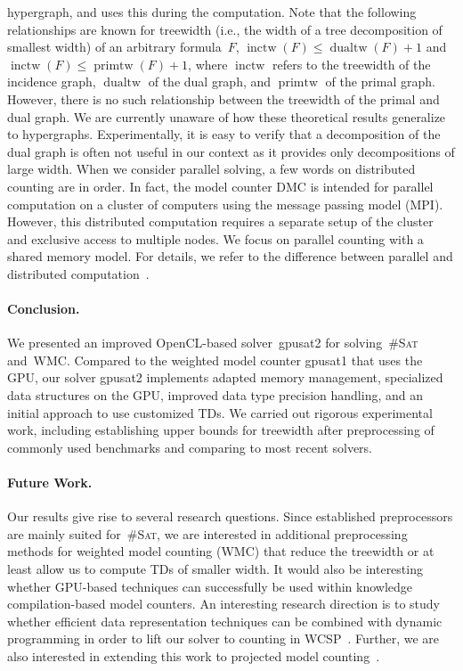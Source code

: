 \documentclass{llncs}
\newcommand{\cSAT}{\textsc{\#Sat}\xspace}%
\newcommand{\WMC}{\textsc{WMC}\xspace}%
\DeclareMathOperator{\inctw}{inctw}
\DeclareMathOperator{\primtw}{primtw}
\DeclareMathOperator{\dualtw}{dualtw}
\newcommand{\gpusatnu}{{\small\textsf{gpusat2}}\xspace}
\newcommand{\gpusatone}{{\small\textsf{gpusat1}}\xspace}
\begin{document}
hypergraph, and uses this during the computation. Note that the
following relationships are known for treewidth (i.e., the width of a
tree decomposition of smallest width) of an arbitrary 
formula~$F$, $\inctw(F) \leq \dualtw(F) + 1$ and
$\inctw(F) \leq \primtw(F) + 1$, where $\inctw$ refers to the treewidth
of the incidence graph, $\dualtw$ of the dual graph, and $\primtw$ of
the primal graph.
%
%
%
%
%
%
However, there is no such relationship between the treewidth of the
primal and dual graph. We are currently unaware of how these
theoretical results generalize to hypergraphs.
%
%
Experimentally, it is easy to verify that a decomposition of the dual
graph is often not useful in our context as it provides only
decompositions of large width.
%
When we consider parallel solving, a few words on distributed counting
are in order. In fact, the model counter DMC
\cite{LagniezMarquisSzczepanski18a} is intended for parallel
computation on a cluster of computers using the message passing model
(MPI). However, this distributed computation requires a separate setup
of the cluster and exclusive access to multiple nodes. We focus on
parallel counting with a shared memory model. For details, we refer to
the difference between parallel and distributed
computation~\cite{Raynal15a}.


%



%

%


%


\paragraph{Conclusion.}
We presented an improved OpenCL-based solver~\gpusatnu for
solving~\cSAT and~\WMC.  Compared to the weighted model counter
\gpusatone that uses the GPU, our solver \gpusatnu implements adapted
memory management, specialized data structures on the GPU, improved
data type precision handling, and an initial approach to use
customized TDs.
%
We carried out rigorous experimental work, including establishing
upper bounds for treewidth after preprocessing of commonly used
benchmarks and comparing to most recent solvers.
%
%

\paragraph{Future Work.}
Our results give rise to several research questions.
Since established preprocessors are mainly suited for~\cSAT, we are
interested in additional preprocessing methods for weighted model
counting (WMC) that reduce the treewidth or at least allow us to
compute TDs of smaller width.
%
It would also be interesting whether GPU-based techniques can
successfully be used within knowledge compilation-based model
counters.
%
An interesting research direction is to study whether
efficient data representation techniques can be combined with dynamic
programming in order to lift our solver to
%
%
counting in WCSP~\cite{FiorettoPontelliYeoh18}.
Further, we are also interested in extending this work to projected
model counting~\cite{FichteEtAl18d,FichteHecher19,FichteHecherMeier19}.
%
%
%

\clearpage
%


%
\end{document}
